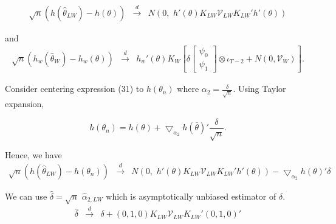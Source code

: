 	\begin{eqnarray}
 			\sqrt{n} (h(\widehat{\theta}_{LW})-h(\theta)) &\overset{d}{\rightarrow}&  			N\left(0,\,\, h'(\theta)K_{LW}\mathcal{V}_{LW}K_{LW}'h'(\theta) \right)
	\end{eqnarray}
	
	
and
\begin{eqnarray}
 	\sqrt{n}(h_w(\widehat{\theta}_{W})-h_w(\theta)) &\overset{d}{\rightarrow}&
 h_w'(\theta)	K_W  \left[\delta \left[\begin{array}{l} \psi_0\\ 
\psi_1 \end{array}\right]  \otimes \iota_{T-2} + N\left(0, \mathcal{V}_W\right) \right].
	\end{eqnarray}

	
	Consider centering expression (31) to $h(\theta_n)$ where $\alpha_2 = \frac{\delta}{\sqrt{n}}$. Using Taylor expansion,
	
	\[
h(\theta_n) = h(\theta) + \bigtriangledown_{\alpha_2} h(\bar{\theta})'\frac{\delta}{\sqrt{n}}.		
	\]	
	
	Hence, we have
	\begin{eqnarray}
 			\sqrt{n} (h(\widehat{\theta}_{LW})-h(\theta_n)) &\overset{d}{\rightarrow}&  			N\left(0,\,\, h'(\theta)K_{LW}\mathcal{V}_{LW}K_{LW}'h'(\theta) \right) -\bigtriangledown_{\alpha_2} h(\theta)'\delta 
	\end{eqnarray}
	
	We can use $\widehat{\delta} = \sqrt{n}\,\, \widehat{\alpha}_{2, LW}$ which is asymptotically unbiased estimator of $\delta$.	
\begin{eqnarray}
 			\widehat{\delta} &\overset{d}{\rightarrow}& \delta + (0, 1, 0)K_{LW} \mathcal{V}_{LW} K_{LW}'(0, 1, 0)'	  			
	\end{eqnarray}	
	
